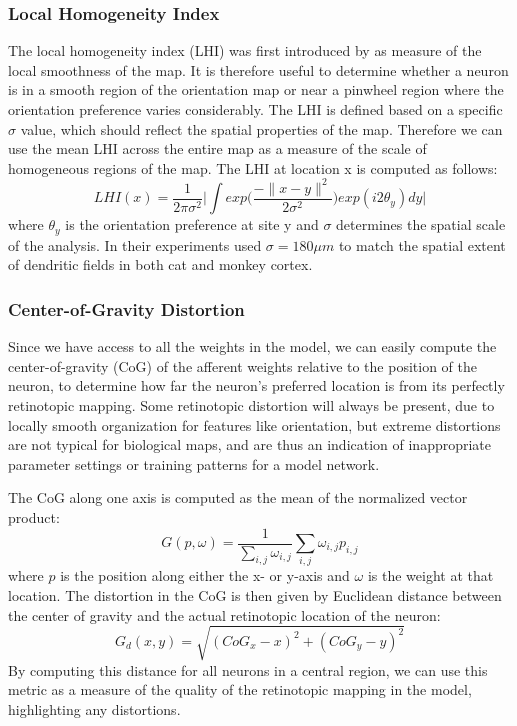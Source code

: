 \subsubsection{Local Homogeneity Index}

The local homogeneity index (LHI) was first introduced by
\cite{Nauhaus2008} as measure of the local smoothness of the map. It
is therefore useful to determine whether a neuron is in a smooth
region of the orientation map or near a pinwheel region where the
orientation preference varies considerably. The LHI is defined based
on a specific $\sigma$ value, which should reflect the spatial
properties of the map. Therefore we can use the mean LHI across the
entire map as a measure of the scale of homogeneous regions of the
map. The LHI at location x is computed as follows:
\begin{equation}
  LHI(x) = \frac{1}{2\pi \sigma^2} \bigg\lvert \int
  exp\bigg(\frac{-\|x-y\|^2}{2\sigma^2}\bigg) exp(i2\theta_y) dy
  \bigg\rvert
\end{equation}
where $\theta_y$ is the orientation preference at site y and $\sigma$
determines the spatial scale of the analysis. In their experiments
\cite{Nauhaus2008} used $\sigma=180\mu m$ to match the spatial extent
of dendritic fields in both cat and monkey cortex.

\subsubsection{Center-of-Gravity Distortion}

Since we have access to all the weights in the model, we can easily compute
the center-of-gravity (CoG) of the afferent weights relative to the
position of the neuron, to determine how far the neuron's preferred
location is from its perfectly retinotopic mapping.  Some retinotopic
distortion will always be present, due to locally smooth organization
for features like orientation, but extreme distortions are not typical
for biological maps, and are thus an indication of inappropriate
parameter settings or training patterns for a model network.

The CoG along one axis is computed as the mean of the normalized
vector product: 
\begin{equation}
  G(p, \omega) = \frac{1}{\sum_{i,j} \omega_{i, j}} \sum_{i,j} \omega_{i,j} p_{i,j}
\end{equation}
where $p$ is the position along either the x- or y-axis and $\omega$
is the weight at that location. The distortion in the CoG is then
given by Euclidean distance between the center of gravity and the
actual retinotopic location of the neuron:
\begin{equation}
  G_d(x, y) = \sqrt{(CoG_x-x)^2 + (CoG_y-y)^2}
\end{equation}
By computing this distance for all neurons in a central region, we can use
this metric as a measure of the quality of the retinotopic mapping in
the model, highlighting any distortions.

